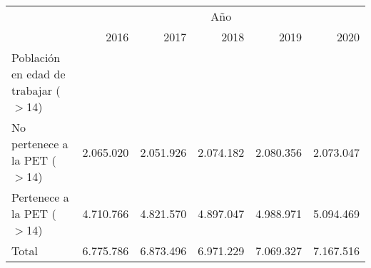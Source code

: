 \begin{tabular}{llllll}
\cline{1-6}
\multicolumn{1}{c}{} &
  \multicolumn{5}{|c}{Año} \\
\multicolumn{1}{c}{} &
  \multicolumn{1}{|r}{2016} &
  \multicolumn{1}{r}{2017} &
  \multicolumn{1}{r}{2018} &
  \multicolumn{1}{r}{2019} &
  \multicolumn{1}{r}{2020} \\
\cline{1-6}
\multicolumn{1}{l}{Población en edad de trabajar ($>$14)} &
  \multicolumn{1}{|r}{} &
  \multicolumn{1}{r}{} &
  \multicolumn{1}{r}{} &
  \multicolumn{1}{r}{} &
  \multicolumn{1}{r}{} \\
\multicolumn{1}{l}{\hspace{1em}No pertenece a la PET ($>$14)} &
  \multicolumn{1}{|r}{2.065.020} &
  \multicolumn{1}{r}{2.051.926} &
  \multicolumn{1}{r}{2.074.182} &
  \multicolumn{1}{r}{2.080.356} &
  \multicolumn{1}{r}{2.073.047} \\
\multicolumn{1}{l}{\hspace{1em}Pertenece a la PET ($>$14)} &
  \multicolumn{1}{|r}{4.710.766} &
  \multicolumn{1}{r}{4.821.570} &
  \multicolumn{1}{r}{4.897.047} &
  \multicolumn{1}{r}{4.988.971} &
  \multicolumn{1}{r}{5.094.469} \\
\multicolumn{1}{l}{\hspace{1em}Total} &
  \multicolumn{1}{|r}{6.775.786} &
  \multicolumn{1}{r}{6.873.496} &
  \multicolumn{1}{r}{6.971.229} &
  \multicolumn{1}{r}{7.069.327} &
  \multicolumn{1}{r}{7.167.516} \\
\cline{1-6}
\end{tabular}
